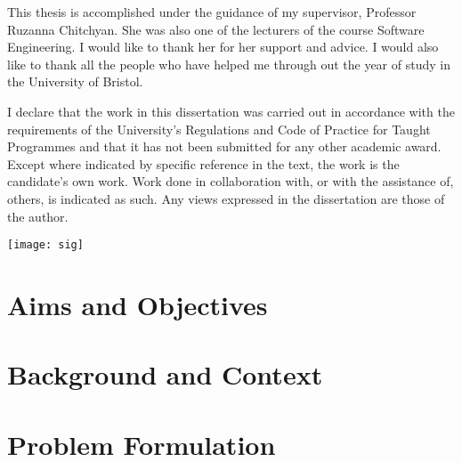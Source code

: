 \documentclass[ieee]{uob-thesis}
\begin{document}
\begin{acknowledgements}
This thesis is accomplished under the guidance of my supervisor, Professor Ruzanna Chitchyan.
She was also one of the lecturers of the course Software Engineering.
I would like to thank her for her support and advice.
I would also like to thank all the people
who have helped me through out the year of study in the University of Bristol.
\end{acknowledgements}

\begin{declaration}
I declare that the work in this dissertation was carried out in accordance
with the requirements of the University's Regulations and Code of Practice for
Taught Programmes and that it has not been submitted for any other academic award.
Except where indicated by specific reference in the text, the work is the
candidate's own work. Work done in collaboration with, or with the assistance
of, others, is indicated as such. Any views expressed in the
dissertation are those of the author.
  
\vspace{2cm}

\texttt{[image: sig]}
\end{declaration}




\frontmatter

\tableofcontents
\listoftables
\listoffigures



\mainmatter

\chapter{Aims and Objectives}
\label{chap_aim}

  

\chapter{Background and Context}
\label{chap_bg}

  

\chapter{Problem Formulation}
\label{chap_problem}
\end{document}
